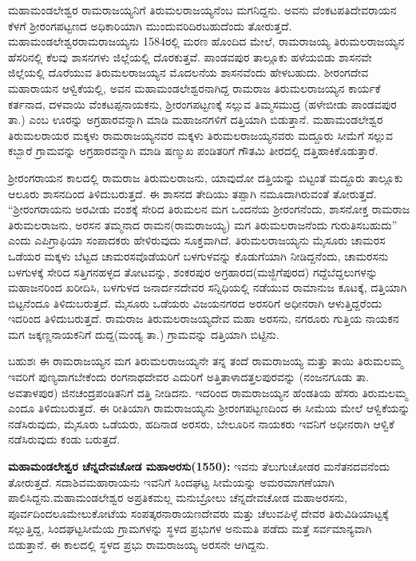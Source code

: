 ಮಹಾಮಂಡಲೇಶ್ವರ ರಾಮರಾಜಯ್ಯನಿಗೆ ತಿರುಮಲರಾಜಯ್ಯನೆಂಬ ಮಗನಿದ್ದನು. ಅವನು ವೆಂಕಟಪತಿ\break ದೇವರಾಯನ ಕೆಳಗೆ ಶ‍್ರೀರಂಗಪಟ್ಟಣದ ಅಧಿಕಾರಿಯಾಗಿ ಮುಂದುವರಿದಿರಬಹುದೆಂದು ತೋರುತ್ತದೆ. ಮಹಾಮಂಡಲೇಶ್ವರ\break ರಾಮರಾಜಯ್ಯನು 1584ರಲ್ಲಿ ಮರಣ ಹೊಂದಿದ ಮೇಲೆ, ರಾಮರಾಜಯ್ಯ ತಿರುಮಲರಾಜಯ್ಯನ ಹೆಸರಿನಲ್ಲಿ ಕೆಲವು ಶಾಸನಗಳು ಜಿಲ್ಲೆಯಲ್ಲಿ ದೊರಕುತ್ತವೆ. ಪಾಂಡವಪುರ ತಾಲ್ಲೂಕು ಹಳೆಯಬಿಡು ಶಾಸನವೇ ಜಿಲ್ಲೆಯಲ್ಲಿ ದೊರೆಯುವ ತಿರುಮಲರಾಜಯ್ಯನ ಮೊದಲನೆಯ ಶಾಸನವೆಂದು ಹೇಳಬಹುದು. ಶೀರಂಗದೇವ ಮಹಾರಾಯನ ಆಳ್ವಿಕೆಯಲ್ಲಿ, ಅವನ ಮಹಾಮಂಡಲೇಶ್ವರನಾಗಿದ್ದ ರಾಮರಾಜ ತಿರುಮಲರಾಜಯ್ಯನ ಕಾರ್ಯಕೆ ಕರ್ತನಾದ, ದಳವಾಯಿ ವೆಂಕಟಪ್ಪನಾಯಕನು, ಶ‍್ರೀರಂಗಪಟ್ಟಣಕ್ಕೆ ಸಲ್ಲುವ ತಿಮ್ಮಸಮುದ್ರ (ಹಳೇಬೀಡು ಪಾಂಡವಪುರ ತಾ.) ಎಂಬ ಊರನ್ನು ಅಗ್ರಹಾರವನ್ನಾಗಿ ಮಾಡಿ ಮಹಾಜನಗಳಿಗೆ ದತ್ತಿಯಾಗಿ ಬಿಡುತ್ತಾನೆ. ಮಹಾಮಂಡಲೇಶ್ವರ ತಿರುಮಲರಾಯರ ಮಕ್ಕಳು ರಾಮರಾಜಯ್ಯನವರ ಮಕ್ಕಳು ತಿರುಮಲರಾಜಯ್ಯನವರು ಮದ್ದೂರು ಸೀಮೆಗೆ ಸಲ್ಲುವ ಕಬ್ಬಾರೆ ಗ್ರಾಮವನ್ನು ಅಗ್ರಹಾರವನ್ನಾಗಿ ಮಾಡಿ ಷಣ್ಮುಖ ಪಂಡಿತರಿಗೆ ಗೌತಮಿ ತೀರದಲ್ಲಿ ದತ್ತಿಹಾಕಿ\-ಕೊಡುತ್ತಾರೆ.

ಶ‍್ರೀರಂಗರಾಯನ ಕಾಲದಲ್ಲಿ ರಾಮರಾಜ ತಿರುಮಲರಾಜನು, ಯಾವುದೋ ದತ್ತಿಯನ್ನು ಬಿಟ್ಟಂತೆ ಮದ್ದೂರು ತಾಲ್ಲೂಕು ಆಲೂರು ಶಾಸನದಿಂದ ತಿಳಿದುಬರುತ್ತದೆ. ಈ ಶಾಸನದ ತೇದಿಯು ತಪ್ಪಾಗಿ ನಮೂದಾಗಿರುವಂತೆ ತೋರುತ್ತದೆ. “ಶ‍್ರೀರಂಗರಾಯನು ಅರವೀಡು ವಂಶಕ್ಕೆ ಸೇರಿದ ತಿರುಮಲನ ಮಗ ಒಂದನೆಯ ಶ‍್ರೀರಂಗನೆಂದು, ಶಾಸನೋಕ್ತ ರಾಮರಾಜ ತಿರುಮಲರಾಜನು, ಅರಸನ ತಮ್ಮನಾದ ರಾಮನ(ರಾಮರಾಜಯ್ಯ) ಮಗ ತಿರುಮಲರಾಜನೆಂದು ಗುರುತಿಸಬಹುದು” ಎಂದು ಎಪಿಗ್ರಾಫಿಯಾ ಸಂಪಾದಕರು ಹೇಳಿರುವುದು ಸೂಕ್ತವಾಗಿದೆ. ತಿರುಮಲರಾಜಯ್ಯನು ಮೈಸೂರು ಚಾಮರಸ ಒಡೆಯರ ಮಕ್ಕಳು ಬೆಟ್ಟದ ಚಾಮರಸವೊಡೆಯರಿಗೆ ಬಳಗುಳವನ್ನು ಕೊಡುಗೆಯಾಗಿ ನೀಡಿದ್ದನೆಂದು, ಚಾಮರಸನು ಬಳಗುಳಕ್ಕೆ ಸೇರಿದ ಸತ್ತಿಗನಹಳ್ಳದ ತೋಟವನ್ನು, ಶಂಕರಪುರ ಅಗ್ರಹಾರದ(ಮಜ್ಜಿಗೆಪುರದ) ಗದ್ದೆಬೆದ್ದಲುಗಳನ್ನು ಮಹಾಜನರಿಂದ ಖರೀದಿಸಿ, ಬಳಗುಳದ ಜನಾರ್ದನದೇವರ ಸನ್ನಿಧಿಯಲ್ಲಿ ನಡೆಯುವ ರಾಮಾನುಜ ಕೂಟಕ್ಕೆ, ದತ್ತಿಯಾಗಿ ಬಿಟ್ಟನೆಂದೂ ತಿಳಿದುಬರುತ್ತದೆ. ಮೈಸೂರು ಒಡೆಯರು ವಿಜಯನಗರದ ಅರಸರಿಗೆ ಅಧೀನರಾಗಿ ಆಳುತ್ತಿದ್ದರೆಂದು ಇದರಿಂದ ತಿಳಿದುಬರುತ್ತದೆ. ರಾಮರಾಜ ತಿರುಮಲರಾಜಯ್ಯದೇವ ಮಹಾ ಅರಸನು, ನಗರೂರು ಗುತ್ತಿಯ ನಾಯಕನ ಮಗ ಜಕ್ಕಣ್ಣನಾಯಕನಿಗೆ ದುದ್ದ(ಮಂಡ್ಯ ತಾ.) ಗ್ರಾಮವನ್ನು ದತ್ತಿಯಾಗಿ ಬಿಟ್ಟಿನು.

ಬಹುಶಃ ಈ ರಾಮರಾಜಯ್ಯನ ಮಗ ತಿರುಮಲರಾಜಯ್ಯನೇ ತನ್ನ ತಂದೆ ರಾಮರಾಜಯ್ಯ ಮತ್ತು ತಾಯಿ ತಿರುಮಲಮ್ಮ ಇವರಿಗೆ ಪುಣ್ಯವಾಗಬೇಕೆಂದು ರಂಗನಾಥದೇವರ ಎದುರಿಗೆ ಅತ್ತಿತಾಳಾದತ್ತಲಪುರವನ್ನು (ನಂಜನಗೂಡು ತಾ. ಅವತಾಳಪುರ) ಜಿನಚಂದ್ರಪಂಡಿತನಿಗೆ ದತ್ತಿ ನೀಡಿದನು. ಇದರಿಂದ ರಾಮರಾಜಯ್ಯನ ಹೆಂಡತಿಯ ಹೆಸರು ತಿರುಮಲಮ್ಮ ಎಂದೂ ತಿಳಿದುಬರುತ್ತದೆ. ಈ ರೀತಿಯಾಗಿ ರಾಮರಾಜಯ್ಯನು ಶ‍್ರೀರಂಗಪಟ್ಟಣದಿಂದ ಈ ಸೀಮೆಯ ಮೇಲೆ ಆಳ್ವಿಕೆಯನ್ನು ನಡೆಸಿರುವುದು, ಮೈಸೂರು ಒಡೆಯರು, ಹದಿನಾಡ ಅರಸರು, ಬೇಲೂರಿನ ನಾಯಕರು ಇವನಿಗೆ ಅಧೀನರಾಗಿ ಆಳ್ವಿಕೆ ನಡೆಸಿರುವುದು ಕಂಡು ಬರುತ್ತದೆ.

\textbf{ಮಹಾಮಂಡಲೇಶ್ವರ ಚೆನ್ನದೇವಚೋಡ ಮಹಾಅರಸು(1550):} ಇವನು ತೆಲುಗುಚೋಡರ ಮನೆತನದವನೆಂದು ತೋರು\-ತ್ತದೆ. ಸದಾಶಿವಮಹಾರಾಯನು ಇವನಿಗೆ ಸಿಂದಘಟ್ಟ ಸೀಮೆಯನ್ನು ಅಮರಮಾಗಣೆಯಾಗಿ ಪಾಲಿಸಿದ್ದನು.\break ಮಹಾಮಂಡಲೇಶ್ವರ ಅಪ್ರತಿಕಮಲ್ಲ ಮನುಬ್ರೋಲು ಚೆನ್ನದೇವಚೋಡ ಮಹಾಅರಸನು, ಪೂರ್ವದಿಂದಲೂ\break ಮೇಲುಕೋಟೆಯ ಸಂಪತ್ಕರನಾರಾಯಣದೇವರು ಮತ್ತು ಚೆಲುವಪಿಳ್ಳೆ ದೇವರ ತಿರುವಿಡಿಯಾಟ್ಟಕ್ಕೆ ಸಲ್ಲುತ್ತಿದ್ದ, ಸಿಂದಘಟ್ಟ\-ಸೀಮೆಯ ಗ್ರಾಮಗಳನ್ನು ಸ್ಥಳದ ಪ್ರಭುಗಳ ಅನುಮತಿ ಪಡೆದು ಮತ್ತೆ ಸರ್ವಮಾನ್ಯವಾಗಿ ಬಿಡುತ್ತಾನೆ. ಈ ಕಾಲದಲ್ಲಿ ಸ್ಥಳದ ಪ್ರಭು ರಾಮರಾಜಯ್ಯ ಅರಸನೇ ಆಗಿದ್ದನು.

